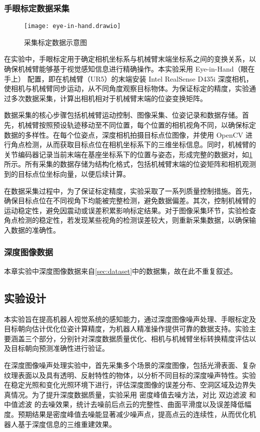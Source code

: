 \subsubsection{手眼标定数据采集}
 \begin{figure}[htb]
	\texttt{[image: eye-in-hand.drawio]}
	\caption[采集标定数据示意图]{采集标定数据示意图} %
	\label{eye-in-hand1}
\end{figure}

在实验中，手眼标定用于确定相机坐标系与机械臂末端坐标系之间的变换关系，以确保机械臂能够基于视觉感知信息进行精确操作。本实验采用 Eye-in-Hand（眼在手上） 配置，即在机械臂（UR5）的末端安装 Intel RealSense D435i 深度相机，使相机与机械臂同步运动，从不同角度观察目标物体。为保证标定的精度，实验通过多次数据采集，计算出相机相对于机械臂末端的位姿变换矩阵。

数据采集的核心步骤包括机械臂运动控制、图像采集、位姿记录和数据存储。首先，机械臂按照预设轨迹移动至不同位置，每个位置的相机视角不同，以确保标定数据的多样性。在每个位姿点，深度相机拍摄目标点位图像，并使用 OpenCV 进行角点检测，从而获取目标点位在相机坐标系下的三维坐标信息。同时，机械臂的关节编码器记录当前末端在基座坐标系下的位置与姿态，形成完整的数据对，如\cref{eye-in-hand1}所示。所有采集的数据存储为结构化格式，包括机械臂末端的位姿矩阵和相机观测到的目标点位坐标向量，以便后续计算。

在数据采集过程中，为了保证标定精度，实验采取了一系列质量控制措施。首先，确保目标点位在不同视角下均能被完整检测，避免数据偏差。其次，控制机械臂的运动稳定性，避免因震动或误差积累影响标定结果。对于图像采集环节，实验检查角点检测的稳定性，若发现某些视角的检测误差较大，则重新采集数据，以确保输入数据的准确性。

\subsubsection{深度图像数据}
本章实验中深度图像数据来自\ref{sec:dataset}中的数据集，故在此不重复叙述。

\subsection{实验设计}
本实验旨在提高机器人视觉系统的感知能力，通过深度图像噪声处理、手眼标定及目标朝向估计优化位姿计算精度，为机器人精准操作提供可靠的数据支持。实验主要涵盖三个部分，分别针对深度数据质量优化、相机与机械臂坐标转换精度评估以及目标朝向预测准确性进行验证。

在深度图像噪声处理实验中，首先采集多个场景的深度图像，包括光滑表面、复杂纹理表面以及具有透明、反射特性的物体，以分析不同目标的深度噪声特性。实验在稳定光照和变化光照环境下进行，评估深度图像的误差分布、空洞区域及边界失真情况。为了提升深度数据质量，实验采用 密度峰值去噪方法，对比 双边滤波 和 中值滤波 的去噪效果，统计去噪前后点云的完整性、曲面平滑度以及误差降低幅度。预期结果是密度峰值去噪能显著减少噪声点，提高点云的连续性，从而优化机器人基于深度信息的三维重建效果。

